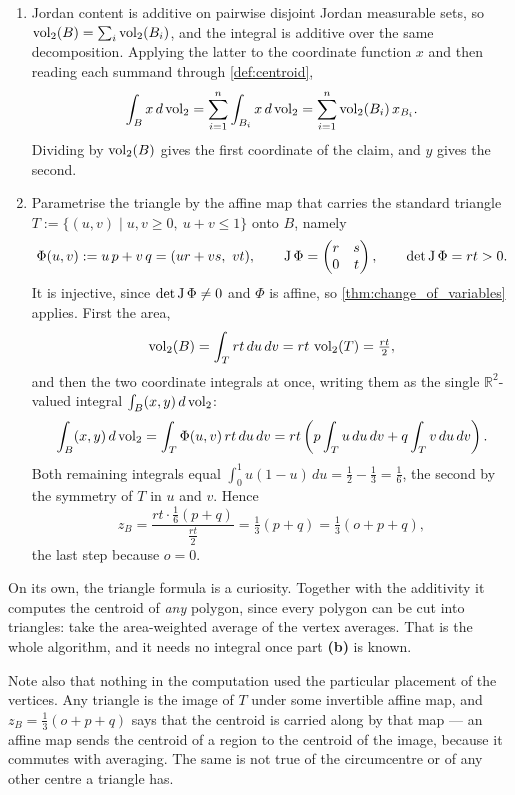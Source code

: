 \begin{exercisesolution}
\label{sol:centroid_additivity_and_triangle}
\begin{enumerate}[label=\textbf{(\alph*)}]
  \item Jordan content is additive on pairwise disjoint Jordan measurable sets, so
    $\operatorname{vol}_2(B) = \sum_i \operatorname{vol}_2(B_i)$, and the integral is additive over the same decomposition.
    Applying the latter to the coordinate function $x$ and then reading each summand through
    \cref{def:centroid},
    \[\int_B x \,d\operatorname{vol}_2 = \sum_{i=1}^n \int_{B_i} x \,d\operatorname{vol}_2
      = \sum_{i=1}^n \operatorname{vol}_2(B_i)\,x_{B_i} .\]
    Dividing by $\operatorname{vol}_2(B)$ gives the first coordinate of the claim, and $y$ gives the second.
  \item Parametrise the triangle by the affine map that carries the standard triangle
    $T := \{(u,v) \mid u,v \geq 0,\ u+v \leq 1\}$ onto $B$, namely
    \[\Phi(u,v) := u\,p + v\,q = (ur+vs,\ vt), \qquad
      \Jac\Phi = \begin{pmatrix} r & s \\ 0 & t \end{pmatrix}, \qquad
      \det\Jac\Phi = rt > 0 .\]
    It is injective, since $\det\operatorname{J}\Phi \neq 0$ and $\Phi$ is affine, so
    \cref{thm:change_of_variables} applies. First the area,
    \[\operatorname{vol}_2(B) = \int_T rt \,du\,dv = rt\,\operatorname{vol}_2(T) = \tfrac{rt}{2},\]
    and then the two coordinate integrals at once, writing them as the single
    $\mathbb{R}^2$-valued integral $\int_B (x,y)\,d\operatorname{vol}_2$:
    \[\int_B (x,y)\,d\operatorname{vol}_2 = \int_T \Phi(u,v)\,rt \,du\,dv
      = rt\left(p\int_T u \,du\,dv + q\int_T v \,du\,dv\right).\]
    Both remaining integrals equal $\int_0^1 u(1-u)\,du = \tfrac12-\tfrac13 = \tfrac16$, the
    second by the symmetry of $T$ in $u$ and $v$. Hence
    \[z_B = \frac{rt\cdot\tfrac16(p+q)}{\tfrac{rt}{2}} = \tfrac13(p+q) = \tfrac13(o+p+q),\]
    the last step because $o = 0$.
\end{enumerate}

\begin{remark}
On its own, the triangle formula is a curiosity. Together with the additivity it computes the
centroid of \emph{any} polygon, since every polygon can be cut into triangles: take the
area-weighted average of the vertex averages. That is the whole algorithm, and it needs no
integral once part \textbf{(b)} is known.

Note also that nothing in the computation used the particular placement of the vertices. Any
triangle is the image of $T$ under some invertible affine map, and $z_B = \tfrac13(o+p+q)$ says
that the centroid is carried along by that map --- an affine map sends the centroid of a region
to the centroid of the image, because it commutes with averaging. The same is not true of the
circumcentre or of any other centre a triangle has.
\end{remark}
\end{exercisesolution}


